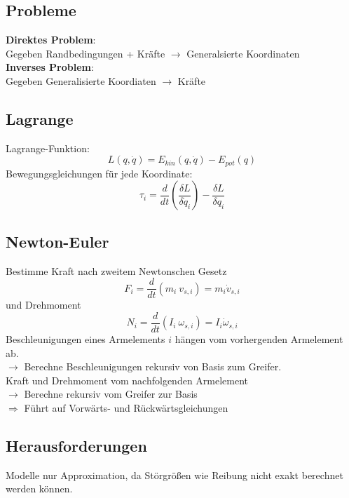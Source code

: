 \subsection{Probleme}%
\label{dyn:sub:probleme}
\textbf{Direktes Problem}:\\
Gegeben Randbedingungen + Kräfte \(\rightarrow\) Generalsierte Koordinaten\\

\textbf{Inverses Problem}:\\
Gegeben Generalisierte Koordiaten \(\rightarrow\) Kräfte

\subsection{Lagrange}%
\label{dyn:sub:lagrange}
Lagrange-Funktion:
\[ L(q, \dot{q}) = E_{\mathit{kin}}(q, \dot{q}) - E_{\mathit{pot}}(q) \]
Bewegungsgleichungen für jede Koordinate:
\[\tau_i = \frac{d}{dt} \left(\frac{\delta L}{\delta \dot{q}_i}\right) - \frac{\delta L}{\delta q_i}\]

\subsection{Newton-Euler}%
\label{dyn:sub:newton-euler}
Bestimme Kraft nach zweitem Newtonschen Gesetz
\[F_i = \frac{d}{dt} (m_i\ v_{s,i}) = m_i \dot{v}_{s,i}\]
und Drehmoment
\[N_i = \frac{d}{dt}(I_i\ \omega_{s,i}) = I_i \dot{\omega}_{s, i}\]
Beschleunigungen eines Armelements \(i\) hängen vom vorhergenden Armelement ab.\\
\(\rightarrow\) Berechne Beschleunigungen rekursiv von Basis zum Greifer.\\
Kraft und Drehmoment vom nachfolgenden Armelement\\
\(\rightarrow\) Berechne rekursiv vom Greifer zur Basis\\

\(\Rightarrow\) Führt auf Vorwärts- und Rückwärtsgleichungen

\subsection{Herausforderungen}%
\label{dyn:sub:herausforderungen}
Modelle nur Approximation, da Störgrößen wie Reibung nicht exakt berechnet werden können.